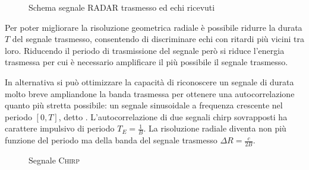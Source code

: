 \begin{figure}[ht]\centering
{}\quad{}
\caption{Schema segnale \ac{RADAR} trasmesso ed echi ricevuti}
\end{figure}

Per poter migliorare la risoluzione geometrica radiale è possibile ridurre la durata $T$ del segnale trasmesso, consentendo di discriminare echi con ritardi più vicini tra loro. Riducendo il periodo di trasmissione del segnale però si riduce l'energia trasmessa per cui è necessario amplificare il più possibile il segnale trasmesso.

In alternativa si può ottimizzare la capacità di riconoscere un segnale di durata molto breve ampliandone la banda trasmessa per ottenere una autocorrelazione quanto più stretta possibile: un segnale sinusoidale a frequenza crescente nel periodo $[0,T]$, detto . L'autocorrelazione di due segnali chirp sovrapposti ha carattere impulsivo di periodo $T_E=\frac{1}{B}$. La risoluzione radiale diventa non più funzione del periodo ma della banda del segnale trasmesso $\Delta R=\frac{c}{2B}$.

\begin{figure}[ht]\centering
	\caption{Segnale \textsc{Chirp}}
\end{figure}

